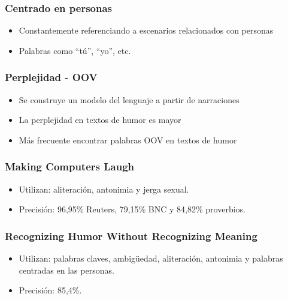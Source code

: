 \begin{frame}
\frametitle{Centrado en personas}
	\begin{itemize}
		\item Constantemente referenciando a escenarios relacionados con personas
		\item Palabras como “tú”, “yo”, etc.
	\end{itemize}
\end{frame}

\begin{frame}
\frametitle{Perplejidad - OOV}
	\begin{itemize}
		\item Se construye un modelo del lenguaje a partir de narraciones
		\item La perplejidad en textos de humor es mayor
		\item Más frecuente encontrar palabras OOV en textos de humor
	\end{itemize}
\end{frame}

\begin{frame}
\frametitle{Making Computers Laugh}
	\begin{itemize}
		\item Utilizan: aliteración, antonimia y jerga sexual.
		\item Precisión: 96,95\% Reuters, 79,15\% BNC y 84,82\% proverbios.
	\end{itemize}
\end{frame}

\begin{frame}
\frametitle{Recognizing Humor Without Recognizing Meaning}
	\begin{itemize}
		\item Utilizan: palabras claves, ambigüedad, aliteración, antonimia y palabras centradas en las personas.
		\item Precisión: 85,4\%.
	\end{itemize}
\end{frame}